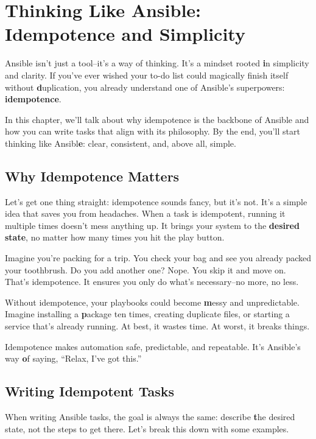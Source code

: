 \chapter{Thinking Like Ansible: Idempotence and Simplicity}

Ansible isn't just a tool--it's a way of thinking. It's a mindset rooted \textbf{i}n simplicity and clarity. If you've ever wished your to-do list could magically finish itself without \textbf{d}uplication, you already understand one of Ansible's superpowers: \textbf{idempotence}.

In this chapter, we'll talk about why idempotence is the backbone of Ansible and how you can write tasks that align with its philosophy. By the end, you'll start thinking like Ansibl\textbf{e}: clear, consistent, and, above all, simple.

\section{Why Idempotence Matters}

Let's get one thing straight: idempotence sounds fancy, but it's not. It's a simple idea that saves you from headaches. When a task is idempotent, running it multiple times doesn't mess anything up. It brings your system to the \textbf{desired state}, no matter how many times you hit the play button.

Imagine you're packing for a trip. You check your bag and see you already packed your toothbrush. Do you add another one? Nope. You skip it and move on. That's idempotence. It ensures you only do what's necessary--no more, no less.

Without idempotence, your playbooks could become \textbf{m}essy and unpredictable. Imagine installing a \textbf{p}ackage ten times, creating duplicate files, or starting a service that's already running. At best, it wastes time. At worst, it breaks things.

Idempotence makes automation safe, predictable, and repeatable. It's Ansible's way \textbf{o}f saying, “Relax, I've got this.”

\section{Writing Idempotent Tasks}

When writing Ansible tasks, the goal is always the same: describe \textbf{t}he desired state, not the steps to get there. Let's break this down with some examples.

